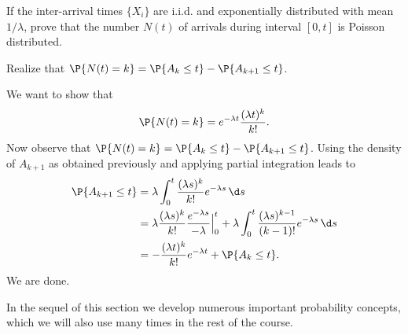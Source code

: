 \begin{exercise}
  If the inter-arrival times $\{X_i\}$ are i.i.d. and exponentially
  distributed with mean $1/\lambda$, prove that the number $N(t)$ of
  arrivals during interval $[0,t]$ is Poisson distributed.
  \begin{hint}
  Realize that
    $\P{N(t)=k} = \P{A_k \leq t} - \P{A_{k+1} \leq t}$.
  \end{hint}
    \begin{solution}
      We want to show that
    \begin{equation*}
      \P{N(t)=k} = e^{-\lambda t}\frac{(\lambda t)^k}{k!}.
    \end{equation*}
    Now observe that
    $\P{N(t)=k} = \P{A_k \leq t} - \P{A_{k+1} \leq t}$.  Using the
    density of $A_{k+1}$ as obtained previously and applying partial
    integration leads to
\begin{align*}
\P{A_{k+1} \leq t} 
&= \lambda \int_0^t \frac{(\lambda s)^{k}}{k!}e^{-\lambda s}\, \d s \\
&= \lambda \frac{(\lambda s)^{k}}{k!}\frac{e^{-\lambda s}}{-\lambda} \Big|_{0}^t + \lambda \int_0^t \frac{(\lambda s)^{k-1}}{(k-1)!}e^{-\lambda s}\, \d s \\
&= - \frac{(\lambda t)^{k}}{k!} e^{-\lambda t} + \P{A_k \leq t}.
\end{align*}
We are done.
    \end{solution}
\end{exercise}



In the sequel of this section we  develop numerous important probability concepts, which we will also use many times in the rest of the course.


